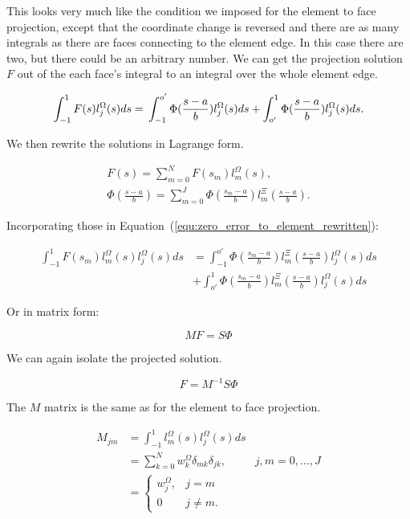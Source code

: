 This looks very much like the condition we imposed for the element to face projection, except that
the coordinate change is reversed and there are as many integrals as there are faces connecting to
the element edge. In this case there are two, but there could be an arbitrary number. We can get the
projection solution $F$ out of the each face's integral to an integral over the whole element edge.

\begin{equation} \label{equ:zero_error_to_element_rewritten}
	\int_{-1}^{1}F(s)l_j^\Omega(s)ds = \\
	\int_{-1}^{o'} \Phi (\frac{s -a}{b}) l_j^\Omega(s)ds + 
	\int_{o'}^{1} \Phi(\frac{s-a}{b})l_j^\Omega(s)ds.
\end{equation}

We then rewrite the solutions in Lagrange form.

\begin{gather}
	F(s) = \sum_{m = 0}^{N}F(s_m)l_m^\Omega(s), \\
	\Phi(\frac{s -a}{b}) = \sum_{m = 0}^{J}\Phi(\frac{s_m -a}{b})l_m^\Xi(\frac{s -a}{b}).
\end{gather}

Incorporating those in Equation~(\ref{equ:zero_error_to_element_rewritten}):

\begin{equation} 
	\begin{aligned}
		\int_{-1}^{1}F(s_m)l_m^\Omega(s) l_j^\Omega(s)ds &= \int_{-1}^{o'} \Phi(\frac{s_m -a}{b})l_m^\Xi(\frac{s -a}{b}) l_j^\Omega(s)ds \\
		&+ \int_{o'}^{1} \Phi(\frac{s_m -a}{b})l_m^\Xi(\frac{s -a}{b}) l_j^\Omega(s)ds
	\end{aligned}
\end{equation}

Or in matrix form:

\begin{equation} 
	MF = S \Phi
\end{equation}

We can again isolate the projected solution.

\begin{equation} 
	F = M^{-1} S \Phi
\end{equation}

The $M$ matrix is the same as for the element to face projection.

\begin{equation} \label{equ:matrix_M_face_to_element}
	\begin{aligned}
		M_{jm} &= \int_{-1}^{1}l_m^{\Omega}(s)l_j^{\Omega}(s)ds \\
		&= \sum_{k = 0}^{N} w_k ^{\Omega} \delta_{mk}\delta_{jk}, & j, m = 0, ..., J \\
		&= \left\{ \begin{matrix}
			w_j^{\Omega }, & j = m \\ 
			0 & j \neq m.
			\end{matrix}\right.
	\end{aligned}
\end{equation}

